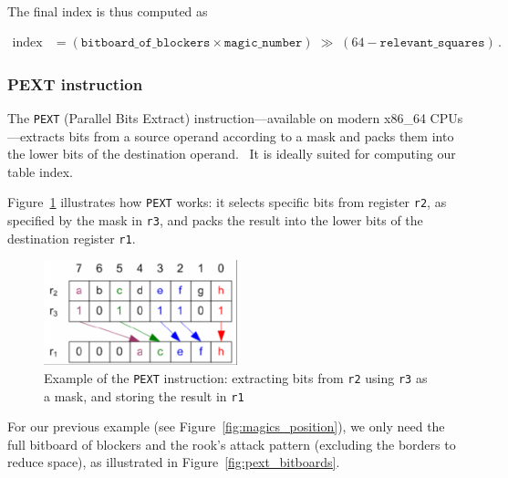 \noindent The final index is thus computed as

\begin{align*}
    \text{index}
    &= (\texttt{bitboard\_of\_blockers} \times \texttt{magic\_number})
       \;\gg\;(64 - \texttt{relevant\_squares})\,.
\end{align*}

\subsubsection{PEXT instruction}

\noindent The \texttt{PEXT} (Parallel Bits Extract) instruction—available on modern x86\_64 CPUs—extracts bits from a source operand according to a mask and packs them into the lower bits of the destination operand.~\cite{PextInstruction} It is ideally suited for computing our table index.

Figure~\ref{fig:pext_instruction_example} illustrates how \texttt{PEXT} works: it selects specific bits from register \texttt{r2}, as specified by the mask in \texttt{r3}, and packs the result into the lower bits of the destination register \texttt{r1}.

\begin{figure}[H]
    \centering
    \includegraphics[width=0.5\textwidth]{Imagenes/pext.png}
    \caption{Example of the \texttt{PEXT} instruction: extracting bits from \texttt{r2} using \texttt{r3} as a mask, and storing the result in \texttt{r1}}
    \label{fig:pext_instruction_example}
\end{figure}

\noindent For our previous example (see Figure~\ref{fig:magics_position}), we only need the full bitboard of blockers and the rook’s attack pattern (excluding the borders to reduce space), as illustrated in Figure~\ref{fig:pext_bitboards}.

